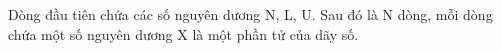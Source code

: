 Dòng đầu tiên chứa các số nguyên dương N, L, U. Sau đó là N dòng, mỗi dòng chứa một số nguyên dương X là một phần tử của dãy số.